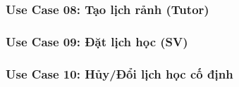 \newpage
\subsubsection*{Use Case 08: Tạo lịch rảnh (Tutor)
}
\begin{samepage}

\end{samepage}


\newpage
\subsubsection*{Use Case 09: Đặt lịch học (SV)}
\begin{samepage}

\end{samepage}


\newpage
\subsubsection*{Use Case 10: Hủy/Đổi lịch học cố định}
\begin{samepage}

\end{samepage}

